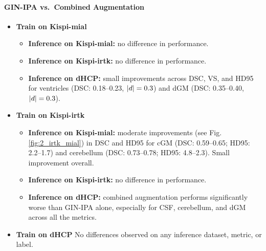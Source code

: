 \paragraph{GIN-IPA vs.\ Combined Augmentation}
\begin{itemize}
  \item \textbf{Train on Kispi-mial}
  \begin{itemize}
    \item \textbf{Inference on Kispi-mial:} no difference in performance.
    \item \textbf{Inference on Kispi-irtk:} no difference in performance.
    \item \textbf{Inference on dHCP:} small improvements across DSC, VS, and HD95 for ventricles (DSC: \numrange[range-open-phrase=from\ ]{0.18}{0.23}, $\lvert d\rvert=0.3$) and dGM (DSC: \numrange[range-open-phrase=from\ ]{0.35}{0.40}, $\lvert d\rvert=0.3$).%
  \end{itemize}
  \item \textbf{Train on Kispi-irtk}
  \begin{itemize}
    \item \textbf{Inference on Kispi-mial:} moderate improvements (see Fig.\,\ref{fig:2_irtk_mial}) in DSC and HD95 for cGM (DSC: \numrange[range-open-phrase=from\ ]{0.59}{0.65}; HD95: \numrange[range-open-phrase=from\ ]{2.2}{1.7}) and cerebellum (DSC: \numrange[range-open-phrase=from\ ]{0.73}{0.78}; HD95: \numrange[range-open-phrase=from\ ]{4.8}{2.3}). Small improvement overall.
    \item \textbf{Inference on Kispi-irtk:} no difference in performance.
    \item \textbf{Inference on dHCP:} combined augmentation performs significantly worse than GIN-IPA alone, especially for CSF, cerebellum, and dGM across all the metrics.
  \end{itemize}
  \item \textbf{Train on dHCP}
  No differences observed on any inference dataset, metric, or label.
\end{itemize}

